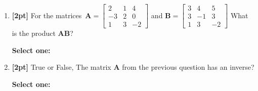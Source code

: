 \documentclass[12pt]{article}
\renewcommand{\circle}{\tikz\draw[black] (0,0) circle (1ex);}
\begin{document}
\begin{enumerate}
\clearpage
    \item \textbf{[2pt]} For the matrices $\mathbf{A}=\begin{bmatrix} 2 & 1 & 4 \\ -3 & 2 & 0 \\ 1 & 3 & -2 \end{bmatrix} $ and $\mathbf{B}=\begin{bmatrix} 3 & 4 & 5 \\ 3 & -1 & 3 \\ 1 & 3 & -2 \end{bmatrix}$
What is the product $\mathbf{AB}$?

    \textbf{Select one:}



    \item \textbf{[2pt]} True or False, The matrix $\mathbf{A}$ from the previous question has an inverse?

    \textbf{Select one:}



\end{enumerate}
\end{document}
